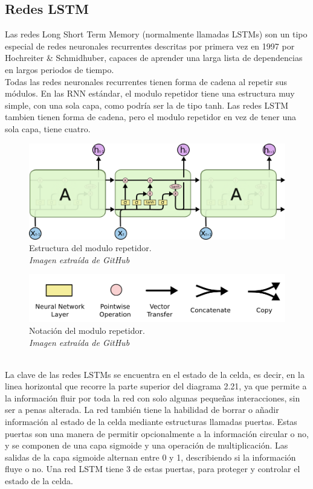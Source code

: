 \subsection{Redes LSTM}
Las redes Long Short Term Memory (normalmente llamadas LSTMs) son un tipo especial de redes neuronales recurrentes descritas por primera vez en 1997 por Hochreiter \& Schmidhuber, capaces de aprender una larga lista de dependencias en largos periodos de tiempo.\\
Todas las redes neuronales recurrentes tienen forma de cadena al repetir sus módulos. En las RNN estándar, el modulo repetidor tiene una estructura muy simple, con una sola capa, como podría ser la de tipo tanh. Las redes LSTM tambien tienen forma de cadena, pero el modulo repetidor en vez de tener una sola capa, tiene cuatro.
\begin{figure}[htp]
\centering
\includegraphics[scale=0.35]{images/LSTM3-chain.png}
\caption{Estructura del modulo repetidor.\\\textit{Imagen extraída de GitHub}}
\end{figure}
\begin{figure}[htp]
\centering
\includegraphics[scale=0.2]{images/LSTM2-notation.png}
\caption{Notación del modulo repetidor.\\\textit{Imagen extraída de GitHub}}
\end{figure}
\\La clave de las redes LSTMs se encuentra en el estado de la celda, es decir, en la linea horizontal que recorre la parte superior del diagrama 2.21, ya que permite a la información fluir por toda la red con solo algunas pequeñas interacciones, sin ser a penas alterada.
La red también tiene la habilidad de borrar o añadir información al estado de la celda mediante estructuras llamadas puertas. Estas puertas son una manera de permitir opcionalmente a la información circular o no, y se componen de una capa sigmoide y una operación de multiplicación. Las salidas de la capa sigmoide alternan entre 0 y 1, describiendo si la información fluye o no. Una red LSTM tiene 3 de estas puertas, para proteger y controlar el estado de la celda.\\\\
